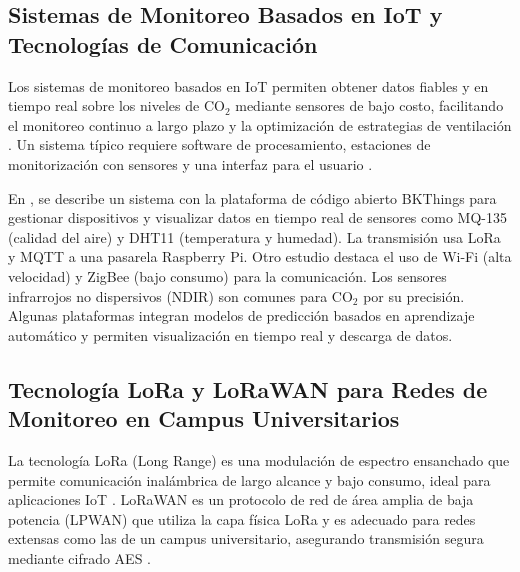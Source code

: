 \subsection{Sistemas de Monitoreo Basados en IoT y Tecnologías de Comunicación}
Los sistemas de monitoreo basados en IoT permiten obtener datos fiables y en tiempo real sobre los niveles de CO\(_2\) mediante sensores de bajo costo, facilitando el monitoreo continuo a largo plazo y la optimización de estrategias de ventilación \cite{Achieving_better_indoor_air_quality_with_IoT_systems_for_future_buildings_Opportunities_and_challenges, indoor_air_quality_assessment_using_a_co2_monitoring_system_based_on_internet_of_things}. Un sistema típico requiere software de procesamiento, estaciones de monitorización con sensores y una interfaz para el usuario \cite{contreras_perez_2020}.

En \cite{Opensource_Based_IoT_Platform_and_LoRa_Communications_with_Edge_Device_Calibration_for_Real_Time_Monitoring_Systems}, se describe un sistema con la plataforma de código abierto BKThings para gestionar dispositivos y visualizar datos en tiempo real de sensores como MQ-135 (calidad del aire) y DHT11 (temperatura y humedad). La transmisión usa LoRa y MQTT a una pasarela Raspberry Pi.
Otro estudio \cite{Achieving_better_indoor_air_quality_with_IoT_systems_for_future_buildings_Opportunities_and_challenges} destaca el uso de Wi-Fi (alta velocidad) y ZigBee (bajo consumo) para la comunicación. Los sensores infrarrojos no dispersivos (NDIR) son comunes para CO\(_2\) por su precisión. Algunas plataformas integran modelos de predicción basados en aprendizaje automático y permiten visualización en tiempo real y descarga de datos.

\subsection{Tecnología LoRa y LoRaWAN para Redes de Monitoreo en Campus Universitarios}
La tecnología LoRa (Long Range) es una modulación de espectro ensanchado que permite comunicación inalámbrica de largo alcance y bajo consumo, ideal para aplicaciones IoT \cite{mokolo_2022}. LoRaWAN es un protocolo de red de área amplia de baja potencia (LPWAN) que utiliza la capa física LoRa y es adecuado para redes extensas como las de un campus universitario, asegurando transmisión segura mediante cifrado AES \cite{Low_Cost_LoRa_Based_IoT_Edge_Device_for_Indoor_Air_Quality_Management_in_Schools}.

